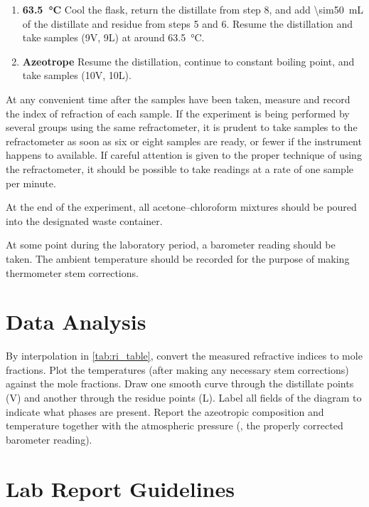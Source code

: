 \begin{enumerate}
	Resume the distillation and take samples (8V, 8L) at about \qty{62.5}{\celsius}. 
	\item \textbf{\qty[mode=text, reset-text-series=false]{63.5}{\celsius}} Cool the flask, return the distillate from step 8, and add \qty{\sim50}{\mL} of the distillate and residue from steps 5 and 6. 
	Resume the distillation and take samples (9V, 9L) at around \qty{63.5}{\celsius}. 
	\item \textbf{Azeotrope} Resume the distillation, continue to constant boiling point, and take samples (10V, 10L). 
\end{enumerate}

At any convenient time after the samples have been taken, measure and record the index of refraction of each sample. 
If the experiment is being performed by several groups using the same refractometer, it is prudent to take samples to the refractometer as soon as six or eight samples are ready, or fewer if the instrument happens to available. 
If careful attention is given to the proper technique of using the refractometer, it should be possible to take readings at a rate of one sample per minute. 

At the end of the experiment, all acetone--chloroform mixtures should be poured into the designated waste container. 

At some point during the laboratory period, a barometer reading should be taken. 
The ambient temperature should be recorded for the purpose of making thermometer stem corrections. 

\section{Data Analysis}
\label{sec:data_analysis}

By interpolation in \cref{tab:ri_table}, convert the measured refractive indices to mole fractions. 
Plot the temperatures (after making any necessary stem corrections) against the mole fractions. 
Draw one smooth curve through the distillate points (V) and another through the residue points (L). 
Label all fields of the diagram to indicate what phases are present. 
Report the azeotropic composition and temperature together with the atmospheric pressure (\ie, the properly corrected barometer reading). 

\section{Lab Report Guidelines} %
\label{sec:lab_report_guidelines}

